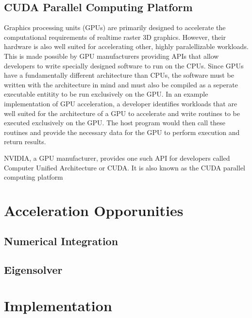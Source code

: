 \documentclass[journal, twoside]{IEEEtran}
\begin{document}
\subsection{CUDA Parallel Computing Platform}

Graphics processing units (GPUs) are primarily designed to accelerate the computational requirements of realtime raster 3D graphics. However, their hardware is also well suited for accelerating other, highly paralellizable workloads. This is made possible by GPU manufacturers providing APIs that allow developers to write specially designed software to run on the CPUs. Since GPUs have a fundamentally different architecture than CPUs, the software must be written with the architecture in mind and must also be compiled as a seperate executable entitity to be run exclusively on the GPU. In an example implementation of GPU acceleration, a developer identifies workloads that are well suited for the architecture of a GPU to accelerate and write routines to be executed exclusively on the GPU. The host program would then call these routines and provide the necessary data for the GPU to perform execution and return results.

NVIDIA, a GPU manufacturer, provides one such API for developers called Computer Unified Architecture or CUDA. It is also known as the CUDA parallel computing platform \cite{nvidia-cuda}


\cite{nvidia-cuda}

\section{Acceleration Opporunities}

\subsection{Numerical Integration}

\subsection{Eigensolver}

\section{Implementation}
\end{document}
